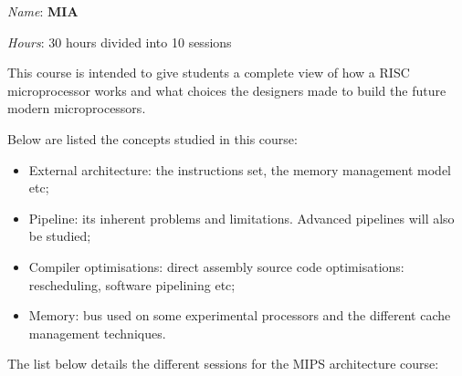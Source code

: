 \begin{multicols}{2}

\textit{Name}: \textbf{MIA}

\textit{Hours}: 30 hours divided into 10 sessions

This course is intended to give students a complete view of how a RISC
microprocessor works and what choices the designers made to build the
future modern microprocessors.

Below are listed the concepts studied in this course:

\begin{itemize}
  \item
    External architecture: the instructions set, the memory management model
    etc;
  \item
    Pipeline: its inherent problems and limitations. Advanced pipelines will
    also be studied;
  \item
    Compiler optimisations: direct assembly source code optimisations:
    rescheduling, software pipelining etc;
  \item
    Memory: bus used on some experimental processors and the different cache
    management techniques.
\end{itemize}

The list below details the different sessions for the MIPS architecture
course:


\end{multicols}
